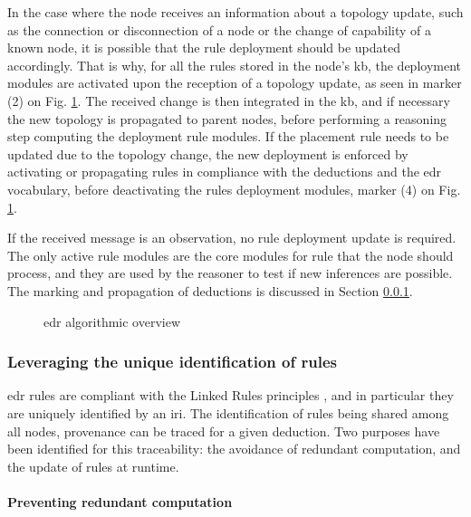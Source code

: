 \documentclass{iosart2c}
\begin{document}
In the case where the node receives an information about a topology update, such as the connection or disconnection of a node or the change of capability of a known node, it is possible that the rule deployment should be updated accordingly.
That is why, for all the rules stored in the node's \gls{kb}, the deployment modules are activated upon the reception of a topology update, as seen in marker (2) on Fig. \ref{fig:edr_algo}.
The received change is then integrated in the \gls{kb}, and if necessary the new topology is propagated to parent nodes, before performing a reasoning step computing the deployment rule modules.
If the placement rule needs to be updated due to the topology change, the new deployment is enforced by activating or propagating rules in compliance with the deductions and the \gls{edr} vocabulary, before deactivating the rules deployment modules, marker (4) on Fig. \ref{fig:edr_algo}.

If the received message is an observation, no rule deployment update is required. 
The only active rule modules are the core modules for rule that the node should process, and they are used by the reasoner to test if new inferences are possible.
The marking and propagation of deductions is discussed in Section \textsection \ref{subsubs:unique_identification}.

\begin{figure}
	\centering
	\caption{\gls{edr} algorithmic overview}
	\label{fig:edr_algo}
	\scalebox{0.7}{
			
	}
\end{figure}

\subsubsection{Leveraging the unique identification of rules}
\label{subsubs:unique_identification}

\gls{edr} rules are compliant with the Linked Rules principles \cite{Khandelwal2011}, and in particular they are uniquely identified by an \gls{iri}.
The identification of rules being shared among all nodes, provenance can be traced for a given deduction.
Two purposes have been identified for this traceability: the avoidance of redundant computation, and the update of rules at runtime.

\paragraph{Preventing redundant computation} 
\end{document}
